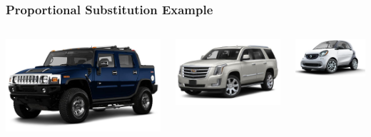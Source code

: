 \documentclass{beamer}\usepackage[]{graphicx}\usepackage[]{color}
\begin{document}
\begin{frame}\frametitle{Proportional Substitution Example}
    \begin{columns}
    	\begin{column}{0.333\textwidth}
    		\includegraphics[width=\textwidth]{hummer.jpg}
    	\end{column}
    	\begin{column}{0.333\textwidth}
    		\includegraphics[width=\textwidth]{escalade.jpg}
    	\end{column}
    	\begin{column}{0.333\textwidth}
    		\includegraphics[width=\textwidth]{smart.png}

\end{column}
\end{columns}
\end{frame}
\end{document}
